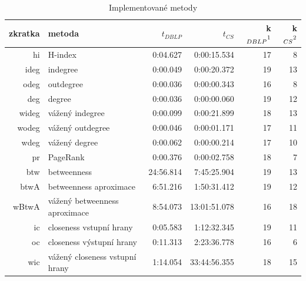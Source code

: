 \documentclass{bakalarka}
\begin{document}
\begin{table}[!ht]
\centering
\caption{Implementované metody}
\label{tab:impmetody}
\begin{small}
\begin{tabular}{r|l|r|r|r|r}
\toprule
zkratka & metoda & $t_{DBLP}$ & $t_{CS}$ & k$_{DBLP}\footnotemark[1]$ & k$_{CS}\footnotemark[2]$ \\
\midrule
hi   &H-index                           & 0:04.627& 0:00:15.534&17&8\\
ideg &indegree                          & 0:00.049& 0:00:20.372&19&13\\
odeg &outdegree                         & 0:00.036& 0:00:00.343&16&8\\
deg  &degree                            & 0:00.036& 0:00:00.060&19&12\\
wideg&vážený indegree                   & 0:00.099& 0:00:21.899&18&13\\
wodeg&vážený outdegree                  & 0:00.046& 0:00:01.171&17&11\\
wdeg &vážený degree                     & 0:00.062& 0:00:00.214&17&10\\
pr   &PageRank                          & 0:00.376& 0:00:02.758&18&7\\
btw  &betweenness                       &24:56.814& 7:45:25.904&19&13\\
btwA &betweenness aproximace            & 6:51.216& 1:50:31.412&19&12\\
wBtwA&vážený betweenness aproximace     & 8:54.073&13:01:51.078&16&18\\
\midrule
ic   &closeness vstupní hrany           & 0:05.583& 1:12:32.345&19&11\\
oc   &closeness výstupní hrany          & 0:11.313& 2:23:36.778&16&6\\
wic  &vážený closeness vstupní hrany    & 1:14.054&33:44:56.355&18&15\\
\bottomrule
\end{tabular}
\end{small}
\end{table}



\end{document}

